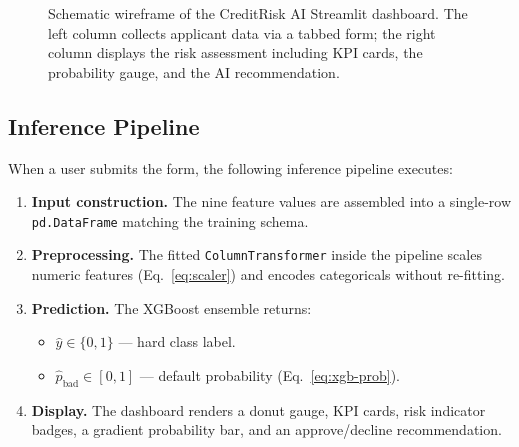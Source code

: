 \documentclass[12pt,a4paper]{article}
\theoremstyle{definition}
\newcommand{\code}[1]{\texttt{#1}}
\begin{document}
\begin{figure}[H]
\caption{Schematic wireframe of the CreditRisk AI Streamlit dashboard.  The left
  column collects applicant data via a tabbed form; the right column displays the
  risk assessment including KPI cards, the probability gauge, and the AI
  recommendation.}
\label{fig:wireframe}
\end{figure}

\subsection{Inference Pipeline}

When a user submits the form, the following inference pipeline executes:

\begin{enumerate}
  \item \textbf{Input construction.} The nine feature values are assembled into a
        single-row \code{pd.DataFrame} matching the training schema.
  \item \textbf{Preprocessing.} The fitted \code{ColumnTransformer} inside the
        pipeline scales numeric features (Eq.~\ref{eq:scaler}) and encodes
        categoricals without re-fitting.
  \item \textbf{Prediction.} The XGBoost ensemble returns:
        \begin{itemize}
          \item $\hat{y} \in \{0, 1\}$ — hard class label.
          \item $\hat{p}_{\text{bad}} \in [0,1]$ — default probability
                (Eq.~\ref{eq:xgb-prob}).
        \end{itemize}
  \item \textbf{Display.} The dashboard renders a donut gauge, KPI cards, risk
        indicator badges, a gradient probability bar, and an approve/decline
        recommendation.
\end{enumerate}
\end{document}
